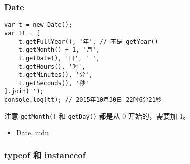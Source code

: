 \subsubsection{Date}\label{date}

\begin{lstlisting}
var t = new Date();
var tt = [
    t.getFullYear(), '年', // 不是 getYear()
    t.getMonth() + 1, '月',
    t.getDate(), '日', ' ',
    t.getHours(), '时',
    t.getMinutes(), '分',
    t.getSeconds(), '秒'
].join('');
console.log(tt); // 2015年10月30日 22时6分21秒
\end{lstlisting}

注意 \lstinline!getMonth()! 和 \lstinline!getDay()! 都是从 0
开始的，需要加 1。

\begin{itemize}
\tightlist
\item
  \href{https://developer.mozilla.org/en-US/docs/Web/JavaScript/Reference/Global_Objects/Date}{Date,
  mdn}
\end{itemize}

\subsubsection{typeof 和 instanceof}\label{typeof-ux548c-instanceof}


